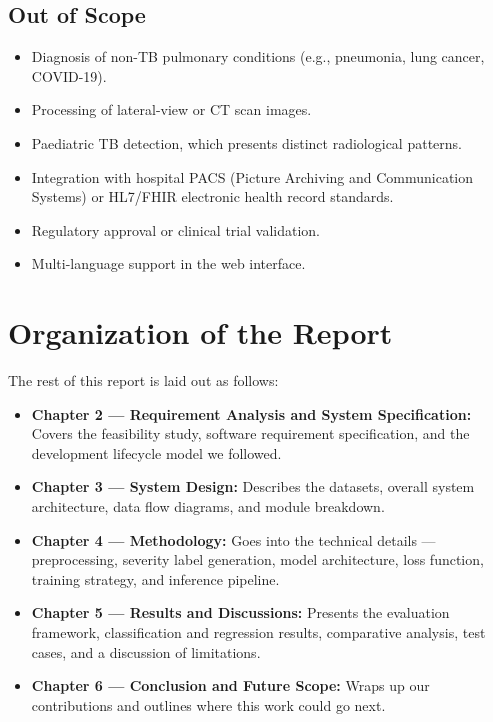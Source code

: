 \documentclass[12pt]{report}
\begin{document}
\subsection{Out of Scope}
\begin{itemize}
    \item Diagnosis of non-TB pulmonary conditions (e.g., pneumonia, lung cancer, COVID-19).
    \item Processing of lateral-view or CT scan images.
    \item Paediatric TB detection, which presents distinct radiological patterns.
    \item Integration with hospital PACS (Picture Archiving and Communication Systems) or HL7/FHIR electronic health record standards.
    \item Regulatory approval or clinical trial validation.
    \item Multi-language support in the web interface.
\end{itemize}

\section{Organization of the Report}

The rest of this report is laid out as follows:

\begin{itemize}
    \item \textbf{Chapter 2 --- Requirement Analysis and System Specification:} Covers the feasibility study, software requirement specification, and the development lifecycle model we followed.
    \item \textbf{Chapter 3 --- System Design:} Describes the datasets, overall system architecture, data flow diagrams, and module breakdown.
    \item \textbf{Chapter 4 --- Methodology:} Goes into the technical details --- preprocessing, severity label generation, model architecture, loss function, training strategy, and inference pipeline.
    \item \textbf{Chapter 5 --- Results and Discussions:} Presents the evaluation framework, classification and regression results, comparative analysis, test cases, and a discussion of limitations.
    \item \textbf{Chapter 6 --- Conclusion and Future Scope:} Wraps up our contributions and outlines where this work could go next.
\end{itemize}
\end{document}
